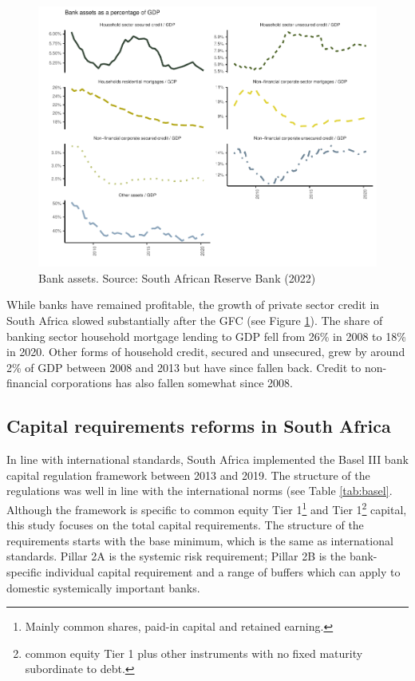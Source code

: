 \documentclass[
]{article}
\begin{document}
\begin{figure}[H]

\includegraphics{Bank_capital_and_bank_lending_files/figure-latex/assets-1} \hfill{}

\caption{Bank assets. Source: South African Reserve Bank (2022)}\label{fig:assets}
\end{figure}

While banks have remained profitable, the growth of private sector credit in South Africa slowed substantially after the GFC (see Figure \ref{fig:assets}). The share of banking sector household mortgage lending to GDP fell from 26\% in 2008 to 18\% in 2020. Other forms of household credit, secured and unsecured, grew by around 2\% of GDP between 2008 and 2013 but have since fallen back. Credit to non-financial corporations has also fallen somewhat since 2008.

\hypertarget{capital-requirements}{%
\subsection{Capital requirements reforms in South Africa}\label{capital-requirements}}

In line with international standards, South Africa implemented the Basel III bank capital regulation framework between 2013 and 2019. The structure of the regulations was well in line with the international norms (see Table \ref{tab:basel}. Although the framework is specific to common equity Tier 1\footnote{Mainly common shares, paid-in capital and retained earning.} and Tier 1\footnote{common equity Tier 1 plus other instruments with no fixed maturity subordinate to debt.} capital, this study focuses on the total capital requirements. The structure of the requirements starts with the base minimum, which is the same as international standards. Pillar 2A is the systemic risk requirement; Pillar 2B is the bank-specific individual capital requirement and a range of buffers which can apply to domestic systemically important banks.
\end{document}
